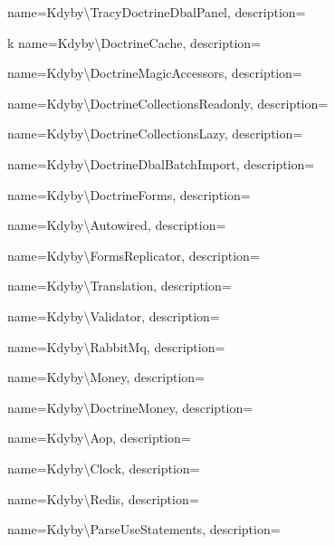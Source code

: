  {
  name={Kdy\-by\textbackslash{}Tra\-cy\-Doc\-tri\-ne\-D\-b\-a\-l\-Pa\-ne\-l},
  description={} }

 k{
  name={Kdy\-by\textbackslash{}Doc\-tri\-ne\-Ca\-che},
  description={} }

 {
  name={Kdy\-by\textbackslash{}Doc\-tri\-ne\-Ma\-gic\-Acces\-sor\-s},
  description={} }

 {
  name={Kdy\-by\textbackslash{}Doc\-tri\-ne\-Collec\-ti\-ons\-Read\-on\-ly},
  description={} }

 {
  name={Kdy\-by\textbackslash{}Doc\-tri\-ne\-Collec\-ti\-ons\-La\-zy},
  description={} }

 {
  name={Kdy\-by\textbackslash{}Doc\-tri\-ne\-Dbal\-Batch\-Im\-port},
  description={} }

 {
  name={Kdy\-by\textbackslash{}Doc\-tri\-ne\-Forms},
  description={} }

 {
  name={Kdy\-by\textbackslash{}Auto\-wi\-red},
  description={} }

 {
  name={Kdy\-by\textbackslash{}Forms\-Re\-pli\-ca\-tor},
  description={} }

 {
  name={Kdy\-by\textbackslash{}Tran\-sla\-tion},
  description={} }

 {
  name={Kdy\-by\textbackslash{}Va\-li\-da\-tor},
  description={} }

 {
  name={Kdy\-by\textbackslash{}Ra\-bbit\-Mq},
  description={} }

 {
  name={Kdy\-by\textbackslash{}Mo\-ney},
  description={} }

 {
  name={Kdy\-by\textbackslash{}Doc\-tri\-ne\-Mo\-ney},
  description={} }

 {
  name={Kdy\-by\textbackslash{}Aop},
  description={} }

 {
  name={Kdy\-by\textbackslash{}Clo\-ck},
  description={} }

 {
  name={Kdy\-by\textbackslash{}Re\-di\-s},
  description={} }

 {
  name={Kdy\-by\textbackslash{}Par\-se\-Use\-Sta\-te\-men\-ts},
  description={} }

